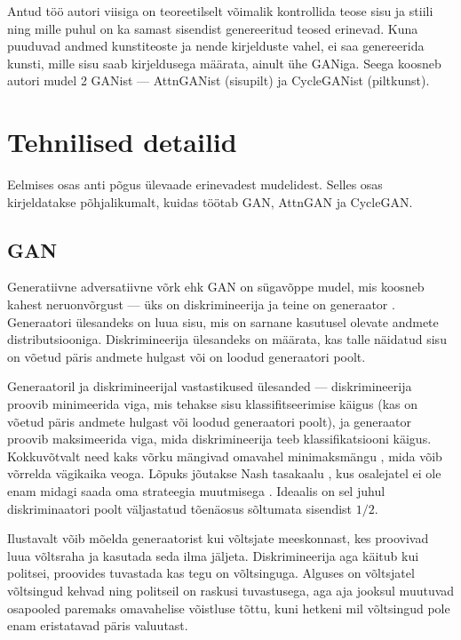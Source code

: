 \documentclass{vilgym}
\begin{document}
	Antud töö autori viisiga on teoreetilselt võimalik kontrollida teose sisu ja stiili ning mille puhul on ka samast sisendist genereeritud teosed erinevad. Kuna puuduvad andmed kunstiteoste ja nende kirjelduste vahel, ei saa genereerida kunsti, mille sisu saab kirjeldusega määrata, ainult ühe GANiga. Seega koosneb autori mudel 2 GANist --- AttnGANist (sisu\textrightarrow pilt) ja CycleGANist (pilt\textrightarrow kunst). %


	\section{Tehnilised detailid}
	Eelmises osas anti põgus ülevaade erinevadest mudelidest. Selles osas kirjeldatakse põhjalikumalt, kuidas töötab GAN, AttnGAN ja CycleGAN.

	\subsection{GAN}
	Generatiivne adversatiivne võrk ehk GAN  on sügavõppe mudel, mis koosneb kahest neruonvõrgust --- üks on diskrimineerija  ja teine on generaator .  Generaatori ülesandeks on luua sisu, mis on sarnane kasutusel olevate andmete distributsiooniga. Diskrimineerija ülesandeks on määrata, kas talle näidatud sisu on võetud päris andmete hulgast või on loodud generaatori poolt.
	
	Generaatoril ja diskrimineerijal vastastikused ülesanded --- diskrimineerija proovib minimeerida viga, mis tehakse sisu klassifitseerimise käigus (kas on võetud päris andmete hulgast või loodud generaatori poolt), ja generaator proovib maksimeerida viga, mida diskrimineerija teeb klassifikatsiooni käigus. Kokkuvõtvalt need kaks võrku mängivad omavahel minimaksmängu , mida võib võrrelda vägikaika veoga. Lõpuks jõutakse Nash tasakaalu , kus osalejatel ei ole enam midagi saada oma strateegia muutmisega \parencite{gametheory}. Ideaalis on sel juhul diskriminaatori poolt väljastatud tõenäosus sõltumata sisendist $ 1/2 $.

	Ilustavalt võib mõelda generaatorist kui võltsjate meeskonnast, kes proovivad luua võltsraha ja kasutada seda ilma jäljeta. Diskrimineerija aga käitub kui politsei, proovides tuvastada kas tegu on võltsinguga. Alguses on võltsjatel võltsingud kehvad ning politseil on raskusi tuvastusega, aga aja jooksul muutuvad osapooled paremaks omavahelise võistluse tõttu, kuni hetkeni mil võltsingud pole enam eristatavad päris valuutast.
\end{document}
